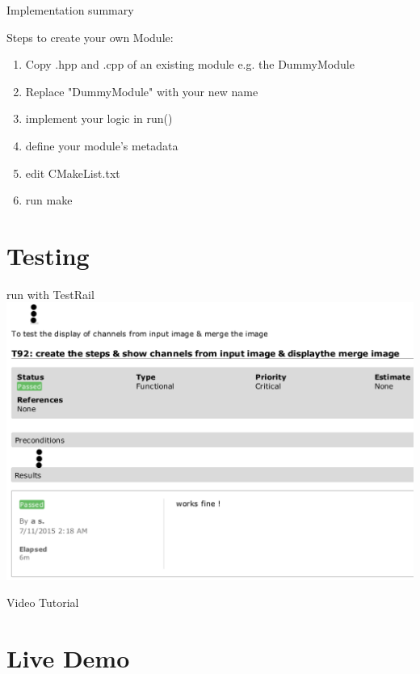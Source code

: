 \documentclass{beamer}
\begin{document}
\begin{frame}[fragile]{Implementation summary}

Steps to create your own Module:
	\begin{enumerate}
		\item Copy .hpp and .cpp of an existing module e.g. the DummyModule \pause
		\item Replace "DummyModule" with your new name \pause
		\item implement your logic in run()  \pause
		\item define your module's metadata \pause
		\item edit CMakeList.txt \pause
		\item run make
	\end{enumerate}



\end{frame}

\section{Testing}
\begin{frame}{run with TestRail}
	\includegraphics[width=\textwidth]{images/eval}
\end{frame}

\begin{frame}{Video Tutorial}
\end{frame}

\section{Live Demo}
\end{document}
